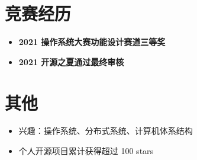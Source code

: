 \documentclass{cv}
\begin{document}
\section{竞赛经历}
\begin{itemize}
  \item \textbf{2021 操作系统大赛功能设计赛道}\quad \textbf{三等奖}
  \item \textbf{2021 开源之夏}\quad \textbf{通过最终审核}
\end{itemize}

\section{其他}
\begin{itemize}
  \item 兴趣：操作系统、分布式系统、计算机体系结构
  \item 个人开源项目累计获得超过 100 stars
\end{itemize}
\end{document}
